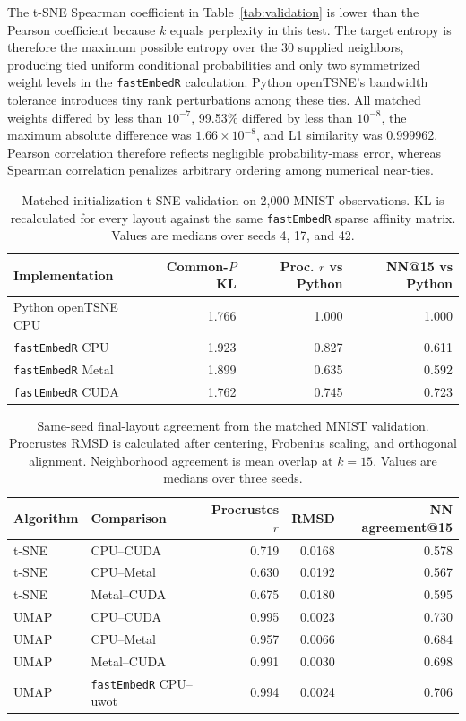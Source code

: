\documentclass[twoside,11pt]{article}
\newcommand{\pkg}{\texttt{fastEmbedR}}
\begin{document}
The t-SNE Spearman coefficient in Table~\ref{tab:validation} is lower than
the Pearson coefficient because $k$ equals perplexity in this test. The target
entropy is therefore the maximum possible entropy over the 30 supplied
neighbors, producing tied uniform conditional probabilities and only two
symmetrized weight levels in the \pkg{} calculation. Python openTSNE's
bandwidth tolerance introduces tiny rank perturbations among these ties.
All matched weights differed by less than $10^{-7}$, 99.53\% differed by less
than $10^{-8}$, the maximum absolute difference was
$1.66\times10^{-8}$, and L1 similarity was 0.999962. Pearson correlation
therefore reflects negligible probability-mass error, whereas Spearman
correlation penalizes arbitrary ordering among numerical near-ties.

\begin{table}[ht]
\centering
\caption{Matched-initialization t-SNE validation on 2,000 MNIST observations.
KL is recalculated for every layout against the same \pkg{} sparse affinity
matrix. Values are medians over seeds 4, 17, and 42.}
\label{tab:matched-tsne}
\scriptsize
\begin{tabular}{lrrr}
\toprule
Implementation & Common-$P$ KL & Proc. $r$ vs Python & NN@15 vs Python\\
\midrule
Python openTSNE CPU & 1.766 & 1.000 & 1.000\\
\pkg{} CPU & 1.923 & 0.827 & 0.611\\
\pkg{} Metal & 1.899 & 0.635 & 0.592\\
\pkg{} CUDA & 1.762 & 0.745 & 0.723\\
\bottomrule
\end{tabular}
\end{table}

\begin{table}[ht]
\centering
\caption{Same-seed final-layout agreement from the matched MNIST validation.
Procrustes RMSD is calculated after centering, Frobenius scaling, and
orthogonal alignment. Neighborhood agreement is mean overlap at $k=15$.
Values are medians over three seeds.}
\label{tab:matched-layout}
\small
\begin{tabular}{llrrr}
\toprule
Algorithm & Comparison & Procrustes $r$ & RMSD & NN agreement@15\\
\midrule
t-SNE & CPU--CUDA & 0.719 & 0.0168 & 0.578\\
t-SNE & CPU--Metal & 0.630 & 0.0192 & 0.567\\
t-SNE & Metal--CUDA & 0.675 & 0.0180 & 0.595\\
UMAP & CPU--CUDA & 0.995 & 0.0023 & 0.730\\
UMAP & CPU--Metal & 0.957 & 0.0066 & 0.684\\
UMAP & Metal--CUDA & 0.991 & 0.0030 & 0.698\\
UMAP & \pkg{} CPU--uwot & 0.994 & 0.0024 & 0.706\\
\bottomrule
\end{tabular}
\end{table}
\end{document}
